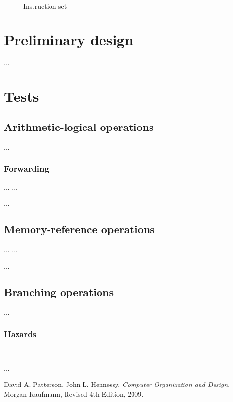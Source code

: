 \documentclass[11pt,twoside,a4paper]{article}
\begin{document}
\begin{figure}[H]
\begin{multicols}{2}
	\end{multicols}
	\caption{Instruction set}
	\label{fig:instruction-set}
\end{figure}

\newpage
\pagestyle{fancy}
\section{Preliminary design}
...

\newpage
\pagestyle{fancy}
\section{Tests}

\subsection{Arithmetic-logical operations}
...

\subsubsection{Forwarding}
\begin{multicols}{2}
\noindent ...
\vfill
\columnbreak
...
\lstset{language=[mips]Assembler}

...
\end{multicols}

\subsection{Memory-reference operations}
\begin{multicols}{2}
\noindent ...
\vfill
\columnbreak
...
\lstset{language=[mips]Assembler}

...
\end{multicols}

\subsection{Branching operations}
...

\subsubsection{Hazards}
\begin{multicols}{2}
\noindent ...
\vfill
\columnbreak
...
\lstset{language=[mips]Assembler}

...
\end{multicols}

\newpage
\pagestyle{fancy}
\begin{thebibliography}{9}

  David A. Patterson, John L. Hennessy,
  \emph{Computer Organization and Design}.
  Morgan Kaufmann,
  Revised 4th Edition,
  2009.

\end{thebibliography}
\end{document}
